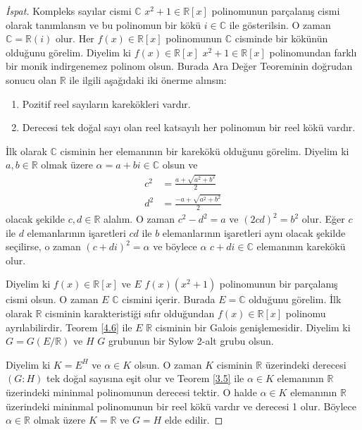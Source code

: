 \documentclass{article}
\theoremstyle{definition}
\theoremstyle{remark}
\begin{document}
    	    \begin{proof}[İspat]
    	        Kompleks sayılar cismi $\mathbb{C}$ $x^2 + 1 \in \mathbb{R}[x]$ polinomunun parçalanış cismi olarak tanımlansın ve bu polinomun bir kökü $i \in \mathbb{C}$ ile gösterilsin. O zaman $\mathbb{C} = \mathbb{R}(i)$ olur. Her $f(x) \in \mathbb{R}[x]$ polinomunun $\mathbb{C}$ cisminde bir kökünün olduğunu görelim. Diyelim ki $f(x) \in \mathbb{R}[x]$ $x^2 + 1 \in \mathbb{R}[x]$ polinomundan farklı bir monik indirgenemez polinom olsun. Burada Ara Değer Teoreminin doğrudan sonucu olan $\mathbb{R}$ ile ilgili aşağıdaki iki önerme alınsın:
    	        \begin{enumerate}
    				\renewcommand{\labelenumi}{(\roman{enumi})}
    				\item Pozitif reel sayıların karekökleri vardır.
    				\item Derecesi tek doğal sayı olan reel katsayılı her polinomun bir reel kökü vardır.
    			\end{enumerate} \par
    			İlk olarak $\mathbb{C}$ cisminin her elemanının bir karekökü olduğunu görelim. Diyelim ki $a, b \in \mathbb{R}$ olmak üzere $\alpha = a + bi \in \mathbb{C}$ olsun ve
    			\begin{align*}
    			    c^2 &= \frac{a + \sqrt{a^2 + b^2}}{2}\\
    			    d^2 &= \frac{-a + \sqrt{a^2 + b^2}}{2}
    			\end{align*}
    			olacak şekilde $c, d \in \mathbb{R}$ alalım. O zaman $c^2 - d^2 = a$ ve $(2cd)^2 = b^2$ olur. Eğer $c$ ile $d$ elemanlarının işaretleri $cd$ ile $b$ elemanlarının işaretleri aynı olacak şekilde seçilirse, o zaman $(c + di)^2 = \alpha$ ve böylece $\alpha$ $c + di \in \mathbb{C}$ elemanının karekökü olur.\par
    			Diyelim ki $f(x) \in \mathbb{R}[x]$ ve $E$ $f(x)(x^2 + 1)$ polinomunun bir parçalanış cismi olsun. O zaman $E$ $\mathbb{C}$ cismini içerir. Burada $E = \mathbb{C}$ olduğunu görelim. İlk olarak $\mathbb{R}$ cisminin karakteristiği sıfır olduğundan $f(x) \in \mathbb{R}[x]$ polinomu ayrılabilirdir. Teorem \ref{4.6} ile $E$ $\mathbb{R}$ cisminin bir Galois genişlemesidir. Diyelim ki $G = G(E/\mathbb{R})$ ve $H$ $G$ grubunun bir Sylow 2-alt grubu olsun.\par
    			Diyelim ki $K = E^H$ ve $\alpha \in K$ olsun. O zaman $K$ cisminin $\mathbb{R}$ üzerindeki derecesi $(G : H)$ tek doğal sayısına eşit olur ve Teorem \ref{3.5} ile $\alpha \in K$ elemanının $\mathbb{R}$ üzerindeki mininmal polinomunun derecesi tektir. O halde $\alpha \in K$ elemanının $\mathbb{R}$ üzerindeki mininmal polinomunun bir reel kökü vardır ve derecesi 1 olur. Böylece $\alpha \in \mathbb{R}$ olmak üzere $K = \mathbb{R}$ ve $G = H$ elde edilir.\par

\end{proof}
\end{document}
